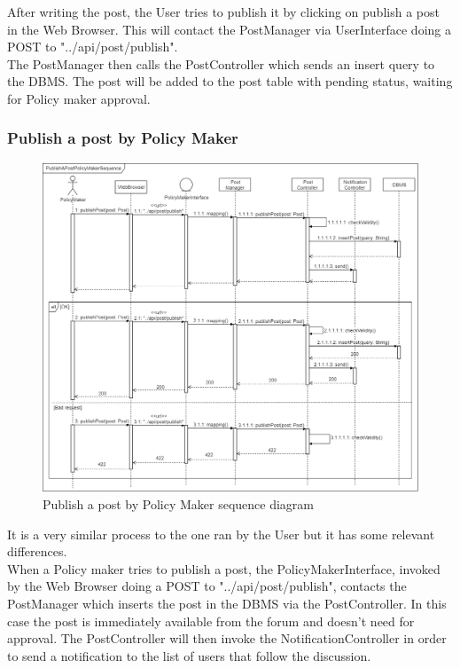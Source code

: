 After writing the post, the User tries to publish it by clicking on publish a post in the Web Browser. This will contact the PostManager via UserInterface doing a POST to "../api/post/publish".\\
The PostManager then calls the PostController which sends an insert query to the DBMS. The post will be added to the post table with pending status, waiting for Policy maker approval.

\newpage
\subsubsection{Publish a post by Policy Maker}

\begin{figure}[h!]
        \centering
        \includegraphics[scale=0.30]{images/runtime_view/publish_post_policy_maker_runtime_view_diagram.png}
        \caption{Publish a post by Policy Maker sequence diagram}
        \label{fig:publish_a_post_policy_maker_sequence_diagram}
\end{figure}
\FloatBarrier

It is a very similar process to the one ran by the User but it has some relevant differences.\\
When a Policy maker tries to publish a post, the PolicyMakerInterface, invoked by the Web Browser doing a POST to "../api/post/publish", contacts the PostManager which inserts the post in the DBMS via the PostController. In this case the post is immediately available from the forum and doesn't need for approval. The PostController will then invoke the NotificationController in order to send a notification to the list of users that follow the discussion.

